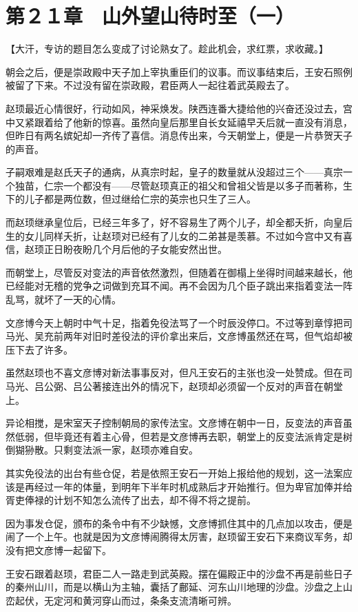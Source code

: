 \section{第２１章　山外望山待时至（一）}

【大汗，专访的题目怎么变成了讨论熟女了。趁此机会，求红票，求收藏。】

朝会之后，便是崇政殿中天子加上宰执重臣们的议事。而议事结束后，王安石照例被留了下来。不过没有留在崇政殿，君臣两人一起往着武英殿去了。

赵顼最近心情很好，行动如风，神采焕发。陕西连番大捷给他的兴奋还没过去，宫中又紧跟着给了他新的惊喜。虽然向皇后那里自长女延禧早夭后就一直没有消息，但昨日有两名嫔妃却一齐传了喜信。消息传出来，今天朝堂上，便是一片恭贺天子的声音。

子嗣艰难是赵氏天子的通病，从真宗时起，皇子的数量就从没超过三个——真宗一个独苗，仁宗一个都没有——尽管赵顼真正的祖父和曾祖父皆是以多子而著称，生下的儿子都是两位数，但过继给仁宗的英宗也只生了三人。

而赵顼继承皇位后，已经三年多了，好不容易生了两个儿子，却全都夭折，向皇后生的女儿同样夭折，让赵顼对已经有了儿女的二弟甚是羡慕。不过如今宫中又有喜信，赵顼正日盼夜盼几个月后他的子女能安然出世。

而朝堂上，尽管反对变法的声音依然激烈，但随着在御榻上坐得时间越来越长，他已经能对无稽的党争之词做到充耳不闻。再不会因为几个臣子跳出来指着变法一阵乱骂，就坏了一天的心情。

文彦博今天上朝时中气十足，指着免役法骂了一个时辰没停口。不过等到章惇把司马光、吴充前两年对旧时差役法的评价拿出来后，文彦博虽然还在骂，但气焰却被压下去了许多。

虽然赵顼也不喜文彦博对新法事事反对，但凡王安石的主张也没一处赞成。但在司马光、吕公弼、吕公著接连出外的情况下，赵顼却必须留一个反对的声音在朝堂上。

异论相搅，是宋室天子控制朝局的家传法宝。文彦博在朝中一日，反变法的声音虽然低弱，但毕竟还有着主心骨，但若是文彦博再去职，朝堂上的反变法派肯定是树倒猢狲散。只剩变法派一家，赵顼亦难自安。

其实免役法的出台有些仓促，若是依照王安石一开始上报给他的规划，这一法案应该是再经过一年的体量，到明年下半年时机成熟后才开始推行。但为卑官加俸并给胥吏俸禄的计划不知怎么流传了出去，却不得不将之提前。

因为事发仓促，颁布的条令中有不少缺憾，文彦博抓住其中的几点加以攻击，便是闹了一个上午。也就是因为文彦博闹腾得太厉害，赵顼留王安石下来商议军务，却没有把文彦博一起留下。

王安石跟着赵顼，君臣二人一路走到武英殿。摆在偏殿正中的沙盘不再是前些日子的秦州山川，而是以横山为主轴，囊括了鄜延、河东山川地理的沙盘。沙盘之上山峦起伏，无定河和黄河穿山而过，条条支流清晰可辨。

